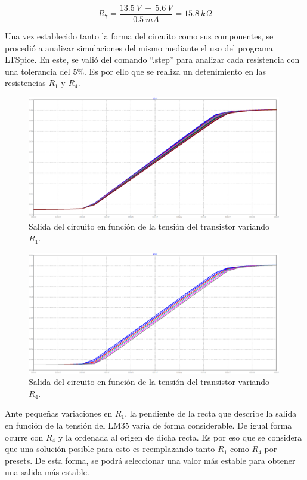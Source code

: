 \documentclass[a4paper]{article}
\begin{document}
\begin{equation}
	R_7 = \frac{13.5 \ V \ - \ 5.6 \ V}{0.5 \ mA} = 15.8 \ k\Omega
	\label{equ:condm1-5}
\end{equation}

Una vez establecido tanto la forma del circuito como sus componentes, se procedió a analizar simulaciones del mismo mediante el uso del programa LTSpice. En este, se valió del comando ``.step'' para analizar cada resistencia con una tolerancia del 5\%. Es por ello que se realiza un detenimiento en las resistencias $R_1$ y $R_4$.

\begin{figure}[H]
	\centering
	\includegraphics[width=0.99\textwidth]{Ejercicio6/Imagenes/StepR1-M1.png}
	\caption{Salida del circuito en función de la tensión del transistor variando $R_1$.}
	\label{fig:r1-M1}
\end{figure}

\begin{figure}[H]
	\centering
	\includegraphics[width=0.99\textwidth]{Ejercicio6/Imagenes/StepR4-M1.png}
	\caption{Salida del circuito en función de la tensión del transistor variando $R_4$.}
	\label{fig:r4-M1}
\end{figure}

Ante pequeñas variaciones en $R_1$, la pendiente de la recta que describe la salida en función de la tensión del LM35 varía de forma considerable. De igual forma ocurre con $R_4$ y la ordenada al origen de dicha recta. Es por eso que se considera que una solución posible para esto es reemplazando tanto $R_1$ como $R_4$ por presets. De esta forma, se podrá seleccionar una valor más estable para obtener una salida más estable.
\end{document}
